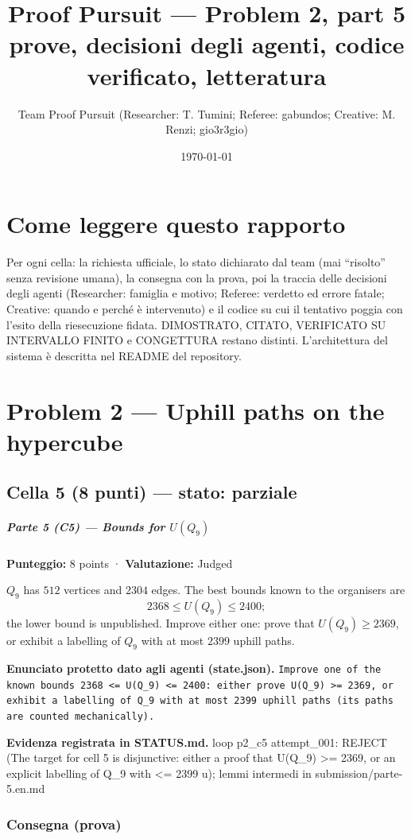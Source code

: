 \documentclass[11pt,a4paper]{article}
\title{Proof Pursuit --- Problem 2, part 5\\ \large prove, decisioni degli agenti, codice verificato, letteratura}
\author{Team Proof Pursuit (Researcher: T. Tumini; Referee: gabundos; Creative: M. Renzi; gio3r3gio)}
\date{\today}
\begin{document}
\maketitle\tableofcontents
\section*{Come leggere questo rapporto}
Per ogni cella: la richiesta ufficiale, lo stato dichiarato dal team (mai ``risolto'' senza revisione umana), la consegna
con la prova, poi la traccia delle decisioni degli agenti (Researcher: famiglia e motivo; Referee: verdetto ed errore
fatale; Creative: quando e perché è intervenuto) e il codice su cui il tentativo poggia con l'esito della riesecuzione
fidata. DIMOSTRATO, CITATO, VERIFICATO SU INTERVALLO FINITO e CONGETTURA restano distinti. L'architettura del sistema
è descritta nel README del repository.
\section{Problem 2 — Uphill paths on the hypercube}
\subsection{Cella 5 (8 punti) — stato: parziale}
\subparagraph{\texorpdfstring{Parte 5 (C5) --- Bounds for
\(U(Q_9)\)}{Parte 5 (C5) --- Bounds for U(Q\_9)}}\label{parte-5-c5-bounds-for-uq_9}

\textbf{Punteggio:} 8 points · \textbf{Valutazione:} Judged

\(Q_9\) has \(512\) vertices and \(2304\) edges. The best bounds known
to the organisers are \[
2368 \le U(Q_9) \le 2400;
\] the lower bound is unpublished. Improve either one: prove that
\(U(Q_9) \ge 2369\), or exhibit a labelling of \(Q_9\) with at most
\(2399\) uphill paths.

\textbf{Enunciato protetto dato agli agenti (state.json).} \texttt{Improve one of the known bounds 2368 \textless{}= U(Q\_9) \textless{}= 2400: either prove U(Q\_9) \textgreater{}= 2369, or exhibit a labelling of Q\_9 with at most 2399 uphill paths (its paths are counted mechanically).}

\textbf{Evidenza registrata in STATUS.md.} loop p2\_c5 attempt\_001: REJECT (The target for cell 5 is disjunctive: either a proof that U(Q\_9) \textgreater{}= 2369, or an explicit labelling of Q\_9 with \textless{}= 2399 u); lemmi intermedi in submission/parte-5.en.md

\subsubsection{Consegna (prova)}
\end{document}
